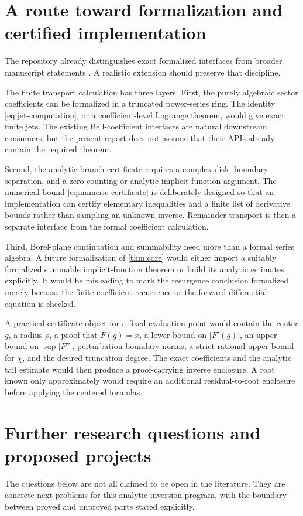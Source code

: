 \documentclass[11pt,a4paper]{article}
\numberwithin{equation}{section}
\theoremstyle{definition}
\theoremstyle{remark}
\begin{document}
\section{A route toward formalization and certified implementation}
\label{sec:formalization}
The repository already distinguishes exact formalized interfaces from broader manuscript statements \cite{repo}. A realistic extension should preserve that discipline.

The finite transport calculation has three layers. First, the purely algebraic sector coefficients can be formalized in a truncated power-series ring. The identity \eqref{eq:jet-computation}, or a coefficient-level Lagrange theorem, would give exact finite jets. The existing Bell-coefficient interfaces are natural downstream consumers, but the present report does not assume that their APIs already contain the required theorem.

Second, the analytic branch certificate requires a complex disk, boundary separation, and a zero-counting or analytic implicit-function argument. The numerical bound \eqref{eq:numeric-certificate} is deliberately designed so that an implementation can certify elementary inequalities and a finite list of derivative bounds rather than sampling an unknown inverse. Remainder transport is then a separate interface from the formal coefficient calculation.

Third, Borel-plane continuation and summability need more than a formal series algebra. A future formalization of \cref{thm:core} would either import a suitably formalized summable implicit-function theorem or build its analytic estimates explicitly. It would be misleading to mark the resurgence conclusion formalized merely because the finite coefficient recurrence or the forward differential equation is checked.

A practical certificate object for a fixed evaluation point would contain the center $g$, a radius $\rho$, a proof that $F(g)=x$, a lower bound on $|F'(g)|$, an upper bound on $\sup|F''|$, perturbation boundary norms, a strict rational upper bound for $\chi$, and the desired truncation degree. The exact coefficients and the analytic tail estimate would then produce a proof-carrying inverse enclosure. A root known only approximately would require an additional residual-to-root enclosure before applying the centered formulas.

\section{Further research questions and proposed projects}
\label{sec:agenda}
The questions below are not all claimed to be open in the literature. They are concrete next problems for this analytic inversion program, with the boundary between proved and unproved parts stated explicitly.
\end{document}
